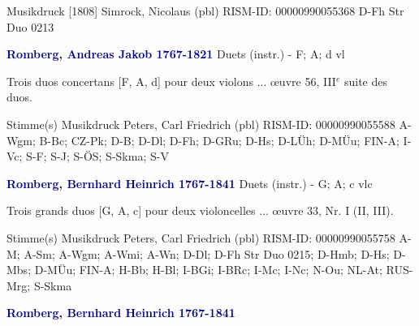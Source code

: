 \documentclass[twocolumn]{book}
\begin{document}
\newline Musikdruck  [1808]
\newline Simrock, Nicolaus  (pbl)
\newline RISM-ID: 00000990055368
\newline D-Fh  Str Duo 0213
\newline \par \vspace{7pt} \textcolor{darkblue}{\textbf{Romberg, Andreas Jakob  1767-1821}}
\newline Duets (instr.) - F; A; d
 vl
\newline \begin{itshape}Trois duos concertans [F, A, d] pour deux violons ... œuvre 56, III$^e$ suite des duos.\end{itshape} 
\newline \textcolor{darkblue}{}  Stimme(s)
\newline Musikdruck
\newline Peters, Carl Friedrich  (pbl)
\newline RISM-ID: 00000990055588
\newline A-Wgm; B-Bc; CZ-Pk; D-B; D-Dl; D-Fh; D-GRu; D-Hs; D-LÜh; D-MÜu; FIN-A; I-Vc; S-F; S-J; S-ÖS; S-Skma; S-V
\newline \par \vspace{7pt} \textcolor{darkblue}{\textbf{Romberg, Bernhard Heinrich  1767-1841}}
\newline Duets (instr.) - G; A; c
 vlc
\newline \begin{itshape}Trois grands duos [G, A, c] pour deux violoncelles ... œuvre 33, Nr. I (II, III).\end{itshape} 
\newline \textcolor{darkblue}{}  Stimme(s)
\newline Musikdruck
\newline Peters, Carl Friedrich  (pbl)
\newline RISM-ID: 00000990055758
\newline A-M; A-Sm; A-Wgm; A-Wmi; A-Wn; D-Dl; D-Fh  Str Duo 0215; D-Hmb; D-Hs; D-Mbs; D-MÜu; FIN-A; H-Bb; H-Bl; I-BGi; I-BRc; I-Mc; I-Nc; N-Ou; NL-At; RUS-Mrg; S-Skma
\newline \par \vspace{7pt} \textcolor{darkblue}{\textbf{Romberg, Bernhard Heinrich  1767-1841}}
\end{document}
